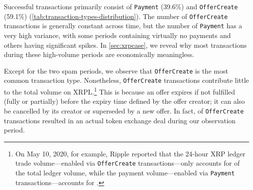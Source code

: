 Successful transactions primarily consist of \texttt{Payment} (39.6\%) and \texttt{OfferCreate} (59.1\%) (\autoref{tab:transaction-types-distribution}). The number of \texttt{OfferCreate} transactions is generally constant across time, but the number of \texttt{Payment} has a very high variance, with some periods containing virtually no payments and others having significant spikes.
In \autoref{sec:xrpcase}, we reveal why most transactions during these high-volume periods are economically meaningless.

Except for the two spam periods, we observe that \texttt{OfferCreate} is the most common transaction type.
Nonetheless, \texttt{OfferCreate} transactions contribute little to the total volume on XRPL.\footnote{
	On May 10, 2020, for example, Ripple reported that the 24-hour XRP ledger trade volume---enabled via \texttt{OfferCreate} transactions---only accounts for  of the total ledger volume, while the payment volume---enabled via \texttt{Payment} transactions---accounts for .
} This is because an offer expires if not fulfilled (fully or partially) before the expiry time defined by the offer creator; it can also be cancelled by its creator or superseded by a new offer. In fact,  of \texttt{OfferCreate} transactions resulted in an actual token exchange deal during our observation period.








